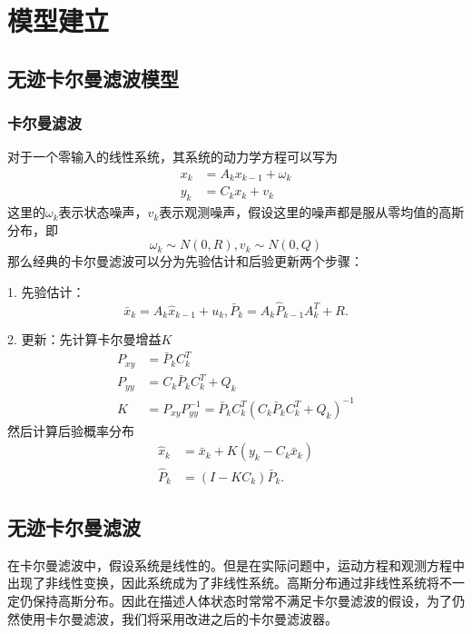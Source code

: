 \newcommand{\sigp}{$\sigma$点}
\newcommand{\sigm}{\sigma^{(m)}}
\section{模型建立}
\subsection{无迹卡尔曼滤波模型}
\subsubsection{卡尔曼滤波}
对于一个零输入的线性系统，其系统的动力学方程可以写为
\begin{align}
    x_k &= A_kx_{k-1} + \omega_k \\
    y_k &= C_kx_k + v_k
\end{align}
这里的$\omega_k$表示状态噪声，$v_k$表示观测噪声，假设这里的噪声都是服从零均值的高斯分布，即
\begin{equation}
    \omega_k \sim N(0,R),v_k\sim N(0,Q)
\end{equation}
那么经典的卡尔曼滤波可以分为先验估计和后验更新两个步骤：

1. 先验估计：
\begin{equation}
    \bar{x}_k = A_k\hat{x}_{k-1} + u_k,\bar{P}_k = A_k\hat{P}_{k-1}A_k^T + R.
\end{equation}

2. 更新：先计算卡尔曼增益$K$
\begin{align}
    P_{xy} &= \bar{P}_kC_k^T \\
    P_{yy} &= C_k\bar{P}_kC_k^T + Q_k \\
    K &= P_{xy}P_{yy}^{-1} = \bar{P}_kC_k^T(C_k\bar{P}_kC_k^T + Q_k)^{-1}
\end{align}
然后计算后验概率分布
\begin{align}
    \hat{x}_k & = \bar{x}_k + K(y_k-C_k\bar{x}_k) \\
    \hat{P}_k &= (I-KC_k)\bar{P}_k.
\end{align}

\subsection{无迹卡尔曼滤波}
在卡尔曼滤波中，假设系统是线性的。但是在实际问题中，运动方程和观测方程中出现了非线性变换，因此系统成为了非线性系统。高斯分布通过非线性系统将不一定仍保持高斯分布。因此在描述人体状态时常常不满足卡尔曼滤波的假设，为了仍然使用卡尔曼滤波，我们将采用改进之后的卡尔曼滤波器。

